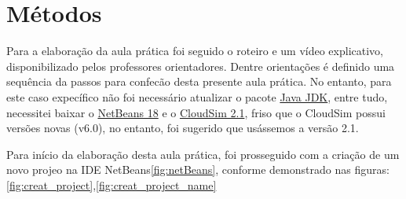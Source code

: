 \section{Métodos}
\par Para a elaboração da aula prática foi seguido o roteiro e um vídeo explicativo, disponibilizado pelos professores orientadores. Dentre orientações é definido uma sequência da passos para  confecão desta presente aula prática. No entanto, para este caso expecífico não foi necessário atualizar o pacote \href{https://www.oracle.com/java/technologies/downloads/}{Java JDK}, entre tudo, necessitei baixar o \href{https://netbeans.apache.org/download/nb19/}{NetBeans 18} e o \href{https://github.com/Cloudslab/cloudsim/releases}{CloudSim 2.1}, friso que o CloudSim possui versões novas (v6.0), no entanto, foi sugerido que usássemos a versão 2.1.

\par Para início da elaboração desta aula prática, foi prosseguido com a criação de um novo projeo na IDE NetBeans\ref{fig:netBeans}, conforme demonstrado nas figuras:\ref{fig:creat_project},\ref{fig:creat_project_name}

